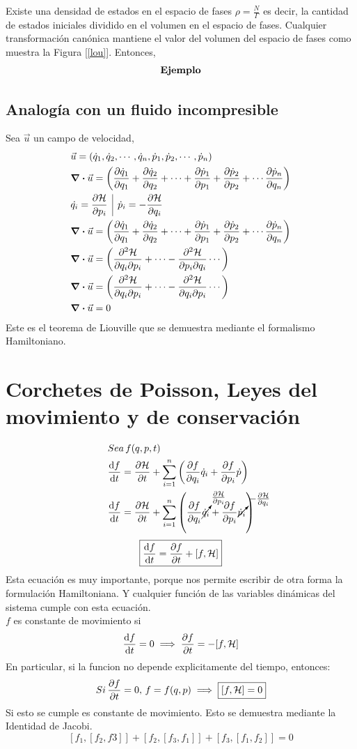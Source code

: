 \documentclass[12pt]{article}
\renewcommand{\H}{\mathcal{H}}
\newcommand{\s}[1]{\section{#1}}
\newcommand{\en}[1]{\[\boxed{#1}\]}
\newcommand{\sumn}[1]{\sum_{#1 =1}^{n}}
\renewcommand{\ss}[1]{\subsection{#1}}
\newcommand{\xn}[1]{{#1}_{1},{#1}_{2},\cdots,{#1}_{n}}
\newcommand{\ej}{\[\textrm{\textbf{Ejemplo}} \]}
\newcommand{\vl}{\,\,\, \vline \,\,\,}
\newcommand{\fgref}[1]{Figura [\ref{#1}]}
\newcommand{\rojo}[1]{{\color{rojo}#1}}
\newcommand{\azulf}[1]{{\color{azul_fosfo}#1}}
\begin{document}
Existe una densidad de estados en el espacio de fases $\rho = \frac{N}{\Gamma}$ es decir, la cantidad de estados iniciales dividido en el volumen en el espacio de fases. Cualquier transformación canónica mantiene el valor del volumen del espacio de fases como muestra la \fgref{lou}. Entonces,  
\ej
\ss{Analogía con un fluido incompresible}
Sea $\vec{u}$ un campo de velocidad,
\begin{align}
&\vec{u}=\qty(\xn{\dot{q}},\xn{\dot{p}})	\\
&\div{\vec{u}}= \qty(\pdv{\dot{q}_1}{q_1}+ \pdv{\dot{q}_2}{q_2}+\cdots+ \pdv{\dot{p}_1}{p_1}+ \pdv{\dot{p}_2}{p_2}+\cdots \pdv{\dot{p}_n}{q_n})\\
&\dot{q_i}=\pdv{\H}{p_i}\vl \dot{p}_i=-\pdv{\H}{q_i}\\
&\div{\vec{u}}= \qty(\pdv{\dot{q}_1}{q_1}+ \pdv{\dot{q}_2}{q_2}+\cdots+ \pdv{\dot{p}_1}{p_1}+ \pdv{\dot{p}_2}{p_2}+\cdots \pdv{\dot{p}_n}{q_n})\\
&\div{\vec{u}}= \qty(\pdv{\H}{q_i}{p_i}+
\cdots-\pdv{\H}{p_i}{q_i}\cdots)\\
&\div{\vec{u}}= \qty(\pdv{\H}{q_i}{p_i}+
\cdots-\pdv{\H}{q_i}{p_i}\cdots)\\
&\div{\vec{u}}=0
\end{align}
Este es el teorema de Liouville que se demuestra mediante el formalismo Hamiltoniano.

\s{Corchetes de Poisson, Leyes del movimiento y de conservación}

\begin{align}
&Sea\, f(q,p,t)\\
&\dv{f}{t}= 	\pdv{\H}{t}+\sumn{i} \qty(\pdv{f}{q_i}\dot{q}_i+\pdv{f}{p_i}\dot{p})\\
&\dv{f}{t}= 	\pdv{\H}{t}+\sumn{i} \qty(\pdv{f}{q_i} \cancelto{\pdv{\H}{p_i}}{\dot{q}_i}+\pdv{f}{p_i} \cancelto{-\pdv{\H}{q_i}}{\dot{p}_i})
\end{align}
\rojo{\en{\dv{f}{t} = \pdv{f}{t}+[f,\H]}}
Esta ecuación es muy importante, porque nos permite escribir de otra forma la formulación Hamiltoniana. Y cualquier función de las variables dinámicas del sistema cumple con esta ecuación.\\
$f$ es constante de movimiento si 
\begin{align}
\dv{f}{t}=0 \implies \pdv{f}{t}= -[f,\H]
\end{align}
 En particular, si la funcion no depende explicitamente del tiempo, entonces:
 \begin{align}
 Si\, \pdv{f}{t}=0,\, f=f(q,p) \implies \boxed{[f,\H]=0}
 \end{align}
Si esto se cumple es constante de movimiento.
Esto se demuestra mediante la Identidad de Jacobi. 
\azulf{\en{[f_1,[f_2,f3]]+ [f_2,[f_3,f_1]] +[f_3,[f_1,f_2]]=0}}
\end{document}
